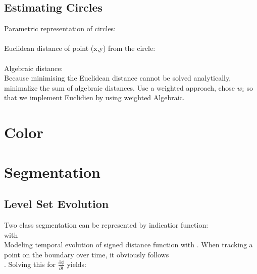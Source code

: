 \documentclass[a4paper,12pt,pdftex]{scrreprt}
\begin{document}
	\section{Estimating Circles} %
	\label{sec:estimating_circles}
	Parametric representation of circles:\\
	\\
	Euclidean distance of point (x,y) from the circle:\\
	\\
	Algebraic distance:\\
	Because minimising the Euclidean distance cannot be solved analytically, minimalize the sum of algebraic distances. Use a weighted approach, chose $w_{i}$ so that we implement Euclidien by using weighted Algebraic.

	\chapter{Color} %
	\label{cha:color}

	\chapter{Segmentation} %
	\label{cha:segmentation}
	
	\section{Level Set Evolution} %
	\label{sec:level_set_evolution}
	Two class segmentation can be represented by indicatior function:\\
	 with \\
	Modeling temporal evolution of signed distance function with . When tracking a point  on the boundary over time, it obviously follows \\
	. Solving this for $\frac{\partial \phi}{\partial t}$ yields:\\
\end{document}
